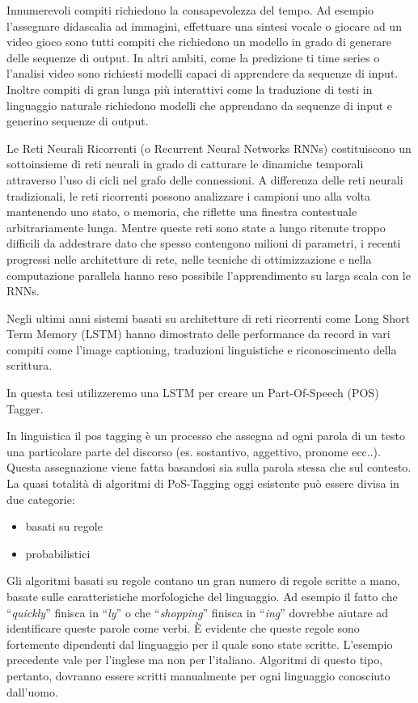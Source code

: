 Innumerevoli compiti richiedono la consapevolezza del tempo.
Ad esempio l'assegnare didascalia ad immagini, effettuare una sintesi vocale o giocare ad un video gioco sono tutti compiti che richiedono un modello in grado di generare delle sequenze di output.
In altri ambiti, come la predizione ti time series o l'analisi video sono richiesti modelli capaci di apprendere da sequenze di input.
Inoltre compiti di gran lunga pi\`u interattivi come la traduzione di testi in linguaggio naturale richiedono modelli che apprendano da sequenze di input e generino sequenze di output.

Le Reti Neurali Ricorrenti (o Recurrent Neural Networks RNNs) costituiscono un sottoinsieme di reti neurali in grado di catturare le dinamiche temporali attraverso l'uso di cicli nel grafo delle connessioni.
A differenza delle reti neurali tradizionali, le reti ricorrenti possono analizzare i campioni uno alla volta mantenendo uno stato, o memoria, che riflette una finestra contestuale arbitrariamente lunga.
Mentre queste reti sono state a lungo ritenute troppo difficili da addestrare dato che spesso contengono milioni di parametri, i recenti progressi nelle architetture di rete, nelle tecniche di ottimizzazione e nella computazione parallela hanno reso possibile l'apprendimento su larga scala con le RNNs.

Negli ultimi anni sistemi basati su architetture di reti ricorrenti come Long Short Term Memory (LSTM) hanno dimostrato delle performance da record in vari compiti come l'image captioning, traduzioni linguistiche e riconoscimento della scrittura.

In questa tesi utilizzeremo una LSTM per creare un Part-Of-Speech (POS) Tagger.

In linguistica il pos tagging \`e un processo che assegna ad ogni parola di un testo una particolare parte del discorso (es. sostantivo, aggettivo, pronome ecc..).
Questa assegnazione viene fatta basandosi sia sulla parola stessa che sul contesto.
La quasi totalit\`a di algoritmi di PoS-Tagging oggi esistente pu\`o essere divisa in due categorie:

\begin{itemize}
  \item basati su regole
  \item probabilistici
\end{itemize}

Gli algoritmi basati su regole contano un gran numero di regole scritte a mano, basate sulle caratteristiche morfologiche del linguaggio.
Ad esempio il fatto che ``\emph{quickly}'' finisca in ``\emph{ly}'' o che ``\emph{shopping}'' finisca in ``\emph{ing}'' dovrebbe aiutare ad identificare queste parole come verbi.
\`E evidente che queste regole sono fortemente dipendenti dal linguaggio per il quale sono state scritte.
L'esempio precedente vale per l'inglese ma non per l'italiano. Algoritmi di questo tipo, pertanto, dovranno essere scritti manualmente per ogni linguaggio conosciuto dall'uomo.

